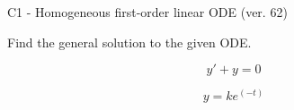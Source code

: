\begin{exercise}
  \begin{exerciseTitle}C1 - Homogeneous first-order linear ODE (ver. 62)\end{exerciseTitle}
  \begin{exerciseStatement}
    
Find the general solution to the given ODE.

    
\[y'+y=0\]

  \end{exerciseStatement}
  \begin{exerciseAnswer}
    
\[y= k e^{\left(-t\right)}\]

  \end{exerciseAnswer}
\end{exercise}